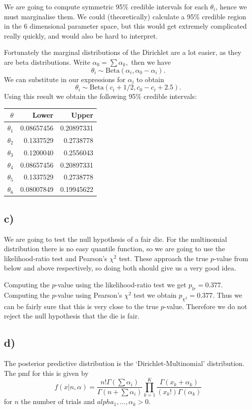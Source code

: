 \documentclass[12pt]{extarticle}
\begin{document}
We are going to compute symmetric 95\% credible intervals for each $\theta_i$, hence we must marginalise them. We could (theoretically) calculate a 95\% credible region in the 6 dimensional parameter space, but this would get extremely complicated really quickly, and would also be hard to interpret. 

Fortunately the marginal distributions of the Dirichlet are a lot easier, as they are beta distributions. Write $\alpha_0 = \sum\alpha_k,$ then we have 
$$\theta_i \sim \mathrm{Beta}\left(\alpha_i, \alpha_0 - \alpha_i\right).$$ We can substitute in our expressions for $\alpha_i$ to obtain $$\theta_i \sim \mathrm{Beta}\left(c_i + 1/2, c_0 - c_i + 2.5\right).$$ Using this result we obtain the following 95\% credible intervals:


\begin{table}[H]
	\centering
	\begin{tabular}{r|rr}
		\hline
		$\theta$ & Lower & Upper\\
		\hline
		$\theta_1$ & 0.08657456 &0.20897331\\
		$\theta_2$ &0.1337529 &0.2738778\\
		$\theta_3$ &0.1200040 &0.2556043\\
		$\theta_4$ &0.08657456 &0.20897331\\
		$\theta_5$ &0.1337529 &0.2738778\\
		$\theta_6$ &0.08007849 &0.19945622\\
	\end{tabular}
\end{table}

\subsection*{c)}
We are going to test the null hypothesis of a fair die. For the multinomial distribution there is no easy quantile function, so we are going to use the likelihood-ratio test and Pearson's $\chi^2$ test. These approach the true $p$-value from below and above respectively, so doing both should give us a very good idea.

Computing the $p$-value using the likelihood-ratio test we get $p_{lr} = 0.377$. Computing the $p$-value using Pearson's $\chi^2$ test we obtain $p_{\chi^2} = 0.377$. Thus we can be fairly sure that this is very close to the true $p$-value. Therefore we do not reject the null hypothesis that the die is fair.

\subsection*{d)}
The posterior predictive distribution is the `Dirichlet-Multinomial' distribution. The pmf for this is given by 
\[
f(x|n, \alpha) = \frac{n!\Gamma(\sum\alpha_i)}{\Gamma(n+\sum\alpha_i)}\prod_{k=1}^{K}\frac{\Gamma(x_k+\alpha_k)}{(x_k!)\Gamma(\alpha_k)}
\]
for $n$ the number of trials and $alpha_1, \dots, \alpha_k > 0.$ 
\end{document}
